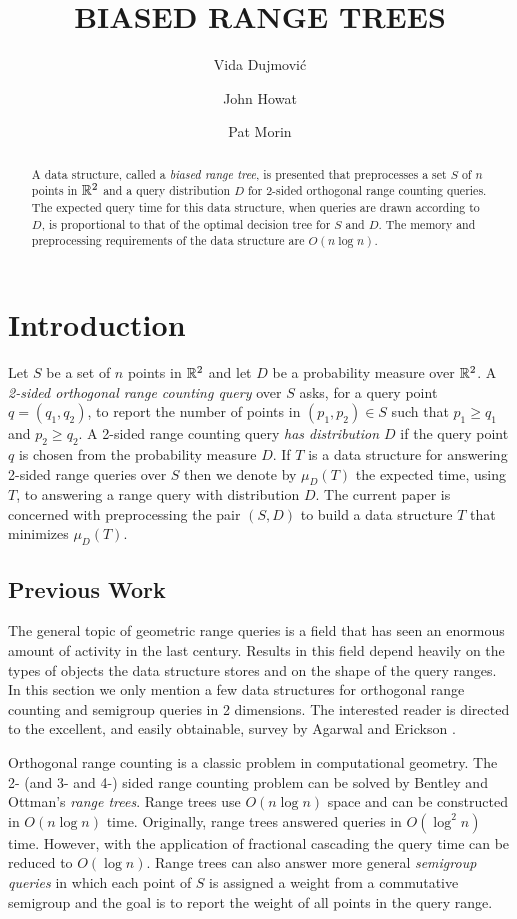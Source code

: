 \documentclass[lotsofwhite,charterfonts]{patmorin}
\title{\MakeUppercase{Biased Range Trees}}
\author{Vida Dujmovi\'c
	\and John Howat
	\and Pat Morin}
\begin{document}
\maketitle
\begin{abstract}
A data structure, called a \emph{biased range tree}, is presented that
preprocesses a set $S$ of $n$ points in $\mathbb{R}^2$ and a query
distribution $D$ for 2-sided orthogonal range counting queries.  The
expected query time for this data structure, when queries are drawn
according to $D$, is proportional to that of the optimal decision tree
for $S$ and $D$.   The memory and preprocessing requirements of the
data structure are $O(n\log n)$.
\end{abstract}

\section{Introduction}

Let $S$ be a set of $n$ points in $\mathbb{R}^2$ and let $D$ be a probability
measure over $\mathbb{R}^2$.  A \emph{2-sided orthogonal range counting query}
over $S$ asks, for a query point $q=(q_1,q_2)$, to report the number
of points in $(p_1,p_2)\in S$ such that $p_1 \ge q_1$ and $p_2 \ge
q_2$.  A 2-sided range counting query \emph{has distribution $D$} if
the query point $q$ is chosen from the probability measure $D$.  If
$T$ is a data structure for answering 2-sided range queries over $S$
then we denote by $\mu_D(T)$ the expected time, using $T$, to
answering a range query with distribution $D$.  The current paper is
concerned with preprocessing the pair $(S,D)$ to build a data
structure $T$ that minimizes $\mu_D(T)$.

\subsection{Previous Work}

The general topic of geometric range queries is a field that has seen
an enormous amount of activity in the last century.  Results in this
field depend heavily on the types of objects the data structure stores
and on the shape of the query ranges.  In this section we only mention
a few data structures for orthogonal range counting and semigroup
queries in 2 dimensions.  The interested reader is directed to the
excellent, and easily obtainable, survey by Agarwal and Erickson
\cite{agarwal_erickson}.

Orthogonal range counting is a classic problem in computational
geometry.  The 2- (and 3- and 4-) sided range counting problem can be
solved by Bentley and Ottman's \emph{range trees}.  Range trees use
$O(n\log n)$ space and can be constructed in $O(n\log n)$ time.
Originally, range trees answered queries in $O(\log^2 n)$ time.
However, with the application of fractional cascading \cite{gcXX} the
query time can be reduced to $O(\log n)$.  Range trees can also answer
more general \emph{semigroup queries} in which each point of $S$ is
assigned a weight from a commutative semigroup and the goal is to
report the weight of all points in the query range.
\end{document}
